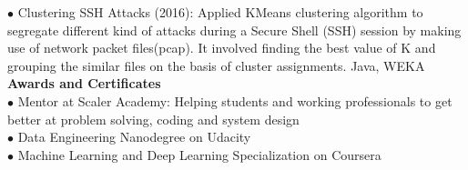 \documentclass[11pt]{article}
\begin{document}
\noindent$\bullet$ Clustering SSH Attacks (2016): Applied KMeans clustering algorithm to segregate different kind of attacks during a Secure Shell (SSH) session by making use of network packet files(pcap). It involved finding the best value of K and grouping the similar files on the basis of cluster assignments. Java, WEKA\\
\vspace{0.4em}\noindent\textbf{Awards and Certificates}\\
\noindent$\bullet$ Mentor at Scaler Academy: Helping students and working professionals to get better at problem solving, coding and system design\\
\noindent$\bullet$ Data Engineering Nanodegree on Udacity\\
\noindent$\bullet$ Machine Learning and Deep Learning Specialization on Coursera\\
\end{document}

